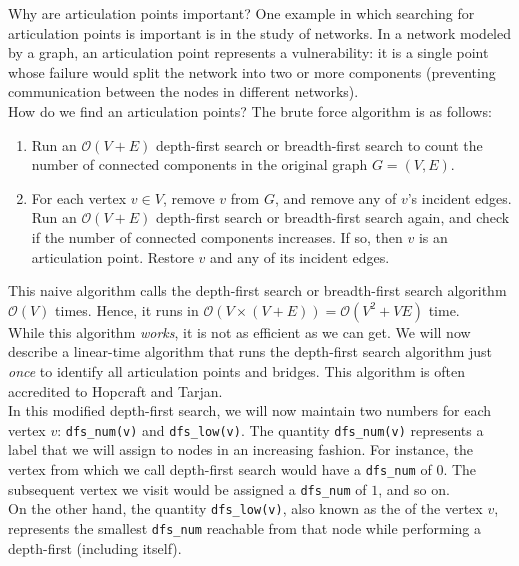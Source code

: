 Why are articulation points important? One example in which searching for articulation points is important is in the study of networks. In a network modeled by a graph, an articulation point represents a vulnerability: it is a single point whose failure would split the network into two or more components (preventing communication between the nodes in different networks). 
 \\
 
 
 How do we find an articulation points? The brute force algorithm is as follows:
 
 \begin{enumerate}
     \item Run an $\mathcal{O}(V + E)$ depth-first search or breadth-first search to count the number of connected components in the original graph $G = (V, E)$. 
     \item For each vertex $v\in V$, remove $v$ from $G$, and remove any of $v$'s incident edges. Run an $\mathcal{O}(V + E)$ depth-first search or breadth-first search again, and check if the number of connected components increases. If so, then $v$ is an articulation point. Restore $v$ and any of its incident edges.
 \end{enumerate}
 
This naive algorithm calls the depth-first search or breadth-first search algorithm $\mathcal{O}(V)$ times. Hence, it runs in $\mathcal{O}(V \times (V + E)) = \mathcal{O}(V^2 + VE)$ time. \\
 
 
While this algorithm \textit{works}, it is not as efficient as we can get. We will now describe a linear-time algorithm that runs the depth-first search algorithm just \textit{once} to identify all articulation points and bridges. This algorithm is often accredited to Hopcraft and Tarjan. \\
 
 
In this modified depth-first search, we will now maintain two numbers for each vertex $v$: \verb!dfs_num(v)! and \verb!dfs_low(v)!. The quantity \verb!dfs_num(v)! represents a label that we will assign to nodes in an increasing fashion. For instance, the vertex from which we call depth-first search would have a \verb!dfs_num! of $0$. The subsequent vertex we visit would be assigned a \verb!dfs_num! of $1$, and so on. \\
 
On the other hand, the quantity \verb!dfs_low(v)!, also known as the  of the vertex $v$, represents the smallest \verb!dfs_num! reachable from that node while performing a depth-first (including itself). \\
 
